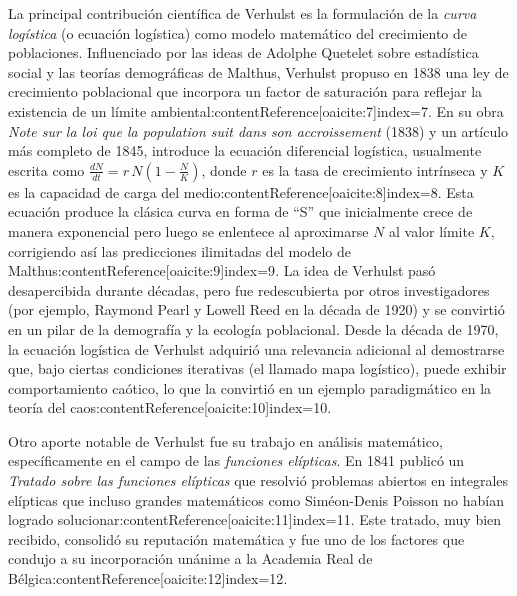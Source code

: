 \documentclass[12pt]{article}
\begin{document}
La principal contribución científica de Verhulst es la formulación de la \emph{curva logística} (o ecuación logística) como modelo matemático del crecimiento de poblaciones. Influenciado por las ideas de Adolphe Quetelet sobre estadística social y las teorías demográficas de Malthus, Verhulst propuso en 1838 una ley de crecimiento poblacional que incorpora un factor de saturación para reflejar la existencia de un límite ambiental:contentReference[oaicite:7]{index=7}. En su obra \emph{Note sur la loi que la population suit dans son accroissement} (1838) y un artículo más completo de 1845, introduce la ecuación diferencial logística, usualmente escrita como $\frac{dN}{dt} = r\,N\left(1 - \frac{N}{K}\right)$, donde $r$ es la tasa de crecimiento intrínseca y $K$ es la capacidad de carga del medio:contentReference[oaicite:8]{index=8}. Esta ecuación produce la clásica curva en forma de “S” que inicialmente crece de manera exponencial pero luego se enlentece al aproximarse $N$ al valor límite $K$, corrigiendo así las predicciones ilimitadas del modelo de Malthus:contentReference[oaicite:9]{index=9}. La idea de Verhulst pasó desapercibida durante décadas, pero fue redescubierta por otros investigadores (por ejemplo, Raymond Pearl y Lowell Reed en la década de 1920) y se convirtió en un pilar de la demografía y la ecología poblacional. Desde la década de 1970, la ecuación logística de Verhulst adquirió una relevancia adicional al demostrarse que, bajo ciertas condiciones iterativas (el llamado mapa logístico), puede exhibir comportamiento caótico, lo que la convirtió en un ejemplo paradigmático en la teoría del caos:contentReference[oaicite:10]{index=10}.

Otro aporte notable de Verhulst fue su trabajo en análisis matemático, específicamente en el campo de las \emph{funciones elípticas}. En 1841 publicó un \emph{Tratado sobre las funciones elípticas} que resolvió problemas abiertos en integrales elípticas que incluso grandes matemáticos como Siméon-Denis Poisson no habían logrado solucionar:contentReference[oaicite:11]{index=11}. Este tratado, muy bien recibido, consolidó su reputación matemática y fue uno de los factores que condujo a su incorporación unánime a la Academia Real de Bélgica:contentReference[oaicite:12]{index=12}. 
\end{document}
